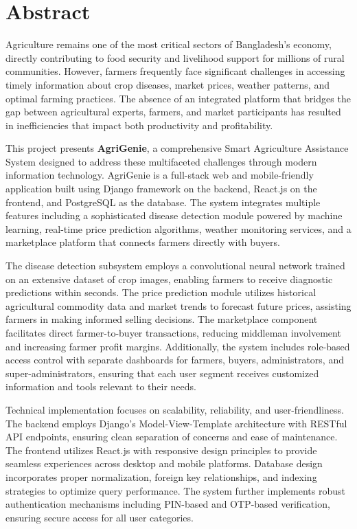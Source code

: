 \documentclass[12pt,a4paper]{report}
\begin{document}
\chapter*{Abstract}

Agriculture remains one of the most critical sectors of Bangladesh's economy, directly contributing to food security and livelihood support for millions of rural communities. However, farmers frequently face significant challenges in accessing timely information about crop diseases, market prices, weather patterns, and optimal farming practices. The absence of an integrated platform that bridges the gap between agricultural experts, farmers, and market participants has resulted in inefficiencies that impact both productivity and profitability.

This project presents \textbf{AgriGenie}, a comprehensive Smart Agriculture Assistance System designed to address these multifaceted challenges through modern information technology. AgriGenie is a full-stack web and mobile-friendly application built using Django framework on the backend, React.js on the frontend, and PostgreSQL as the database. The system integrates multiple features including a sophisticated disease detection module powered by machine learning, real-time price prediction algorithms, weather monitoring services, and a marketplace platform that connects farmers directly with buyers.

The disease detection subsystem employs a convolutional neural network trained on an extensive dataset of crop images, enabling farmers to receive diagnostic predictions within seconds. The price prediction module utilizes historical agricultural commodity data and market trends to forecast future prices, assisting farmers in making informed selling decisions. The marketplace component facilitates direct farmer-to-buyer transactions, reducing middleman involvement and increasing farmer profit margins. Additionally, the system includes role-based access control with separate dashboards for farmers, buyers, administrators, and super-administrators, ensuring that each user segment receives customized information and tools relevant to their needs.

Technical implementation focuses on scalability, reliability, and user-friendliness. The backend employs Django's Model-View-Template architecture with RESTful API endpoints, ensuring clean separation of concerns and ease of maintenance. The frontend utilizes React.js with responsive design principles to provide seamless experiences across desktop and mobile platforms. Database design incorporates proper normalization, foreign key relationships, and indexing strategies to optimize query performance. The system further implements robust authentication mechanisms including PIN-based and OTP-based verification, ensuring secure access for all user categories.
\end{document}
